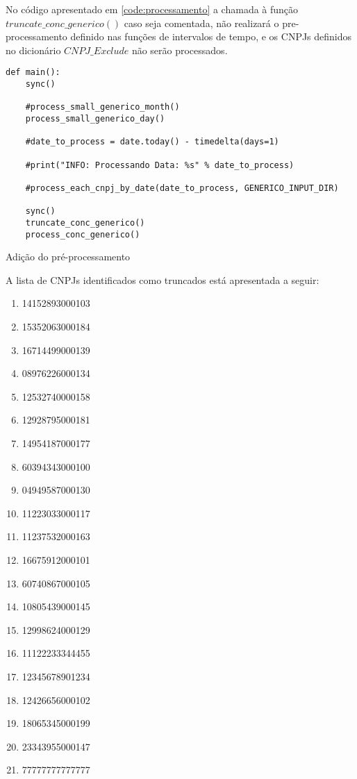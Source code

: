 \documentclass{article}      %
\begin{document}
No código apresentado em \ref{code:processamento} a chamada à função $truncate\_conc\_generico()$ caso seja comentada, não realizará o pre-processamento definido nas funções de intervalos de tempo, e os CNPJs definidos no dicionário $CNPJ\_Exclude$ não serão processados.
 
\begin{listing}[H]
\begin{verbatim}
def main():
    sync()
    
    #process_small_generico_month()
    process_small_generico_day()

    #date_to_process = date.today() - timedelta(days=1)
    
    #print("INFO: Processando Data: %s" % date_to_process)
    
    #process_each_cnpj_by_date(date_to_process, GENERICO_INPUT_DIR)

    sync()
    truncate_conc_generico()
    process_conc_generico()
\end{verbatim}

\caption{Adição do pré-processamento}
\label{code:processamento}

\end{listing}


A lista de CNPJs identificados como truncados está apresentada a seguir:

\begin{enumerate}
\item 14152893000103 
\item 15352063000184 
\item 16714499000139
\item 08976226000134
\item 12532740000158 
\item 12928795000181 
\item 14954187000177 
\item 60394343000100 
\item 04949587000130 
\item 11223033000117
\item 11237532000163
\item 16675912000101 
\item 60740867000105 
\item 10805439000145
\item 12998624000129 
\item 11122233344455 
\item 12345678901234
\item 12426656000102
\item 18065345000199
\item 23343955000147
\item 77777777777777
\end{enumerate}
\end{document}
